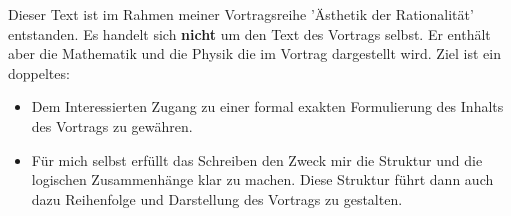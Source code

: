 Dieser Text ist im Rahmen meiner Vortragsreihe 'Ästhetik der Rationalität' entstanden. Es handelt sich \textbf{nicht} um den Text des Vortrags selbst. Er enthält aber die Mathematik und die Physik die im Vortrag dargestellt wird. Ziel ist ein doppeltes:
\begin{itemize}
	\item Dem Interessierten Zugang zu einer formal exakten Formulierung des Inhalts des Vortrags zu gewähren.
	\item Für mich selbst erfüllt das Schreiben den Zweck mir die Struktur und die logischen Zusammenhänge klar zu machen. Diese Struktur führt dann auch dazu Reihenfolge und Darstellung des Vortrags zu gestalten.
\end{itemize}
